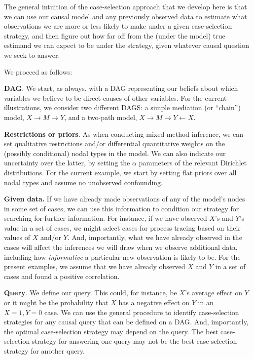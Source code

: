 \documentclass[
  12pt,
]{book}
\begin{document}
The general intuition of the case-selection approach that we develop here is that we can use our causal model and any previously observed data to estimate what observations we are more or less likely to make under a given case-selection strategy, and then figure out how far off from the (under the model) true estimand we can expect to be under the strategy, given whatever causal question we seek to answer.

We proceed as follows:

\textbf{DAG}. We start, as always, with a DAG representing our beliefs about which variables we believe to be direct causes of other variables. For the current illustrations, we consider two different DAGS: a simple mediation (or ``chain'') model, \(X \rightarrow M \rightarrow Y\), and a two-path model, \(X \rightarrow M \rightarrow Y \leftarrow X\).

\textbf{Restrictions or priors}. As when conducting mixed-method inference, we can set qualitative restrictions and/or differential quantitative weights on the (possibly conditional) nodal types in the model. We can also indicate our uncertainty over the latter, by setting the \(\alpha\) parameters of the relevant Dirichlet distributions. For the current example, we start by setting flat priors over all nodal types and assume no unobserved confounding.

\textbf{Given data.} If we have already made observations of any of the model's nodes in some set of cases, we can use this information to condition our strategy for searching for further information. For instance, if we have observed \(X\)'s and \(Y\)'s value in a set of cases, we might select cases for process tracing based on their values of \(X\) and/or \(Y\). And, importantly, what we have already observed in the cases will affect the inferences we will draw when we observe additional data, including how \emph{informative} a particular new observation is likely to be. For the present examples, we assume that we have already observed \(X\) and \(Y\) in a set of cases and found a positive correlation.

\textbf{Query}. We define our query. This could, for instance, be \(X\)'s average effect on \(Y\) or it might be the probability that \(X\) has a negative effect on \(Y\) in an \(X=1, Y=0\) case. We can use the general procedure to identify case-selection strategies for any causal query that can be defined on a DAG. And, importantly, the optimal case-selection strategy may depend on the query. The best case-selection strategy for answering one query may not be the best case-selection strategy for another query.
\end{document}

